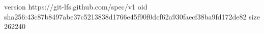 version https://git-lfs.github.com/spec/v1
oid sha256:43c87b8497abe37c5213838d1766e45f90f0dcf62a930faecf38ba9fd172de82
size 262240
